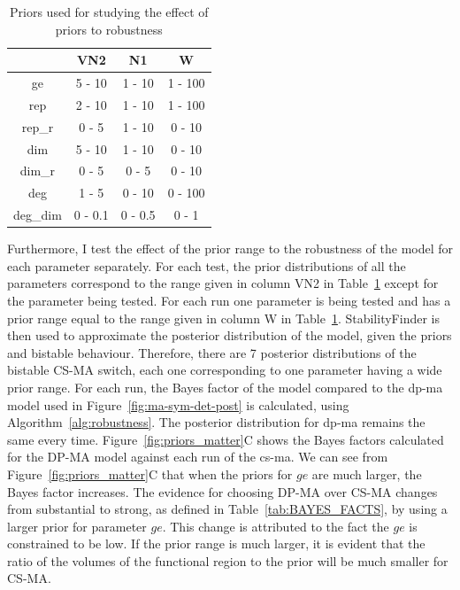 \begin{table}[tb]
\centering
\caption{Priors used for studying the effect of priors to robustness}
\label{tab:prior_study}
\begin{tabular}{@{}cccc@{}}
\toprule
         & VN2 & N1  & W    \\ \midrule
ge       & 5 - 10      & 1 - 10  & 1 - 100 \\
rep      & 2 - 10      & 1 - 10  & 1 - 100 \\
rep\_r   & 0 - 5       & 1 - 10  & 0 - 10  \\
dim      & 5 - 10      & 1 - 10  & 0 - 10  \\
dim\_r   & 0 - 5       & 0 - 5   & 0 - 10  \\
deg      & 1 - 5       & 0 - 10  & 0 - 100 \\
deg\_dim & 0 - 0.1     & 0 - 0.5 & 0 - 1   \\ \bottomrule
\end{tabular}
\end{table}

Furthermore, I test the effect of the prior range to the robustness of the model for each parameter separately. For each test, the prior distributions of all the parameters correspond to the range given in column VN2 in Table~\ref{tab:prior_study} except for the parameter being tested. For each run one parameter is being tested and has a prior range equal to the range given in column W in Table~\ref{tab:prior_study}. StabilityFinder is then used to approximate the posterior distribution of the model, given the priors and bistable behaviour. Therefore, there are 7 posterior distributions of the bistable CS-MA switch, each one corresponding to one parameter having a wide prior range. For each run, the Bayes factor of the model compared to the \acrshort{dp-ma} model used in Figure~\ref{fig:ma-sym-det-post} is calculated, using Algorithm~\ref{alg:robustness}. The posterior distribution for \acrshort{dp-ma} remains the same every time. Figure~\ref{fig:priors_matter}C shows the Bayes factors calculated for the DP-MA model against each run of the \acrshort{cs-ma}. We can see from Figure~\ref{fig:priors_matter}C that when the priors for $ge$ are much larger, the Bayes factor increases. The evidence for choosing DP-MA over CS-MA changes from substantial to strong, as defined in Table~\ref{tab:BAYES_FACTS}, by using a larger prior for parameter $ge$. This change is attributed to the fact the $ge$ is constrained to be low. If the prior range is much larger, it is evident that the ratio of the volumes of the functional region to the prior will be much smaller for CS-MA. %
 

